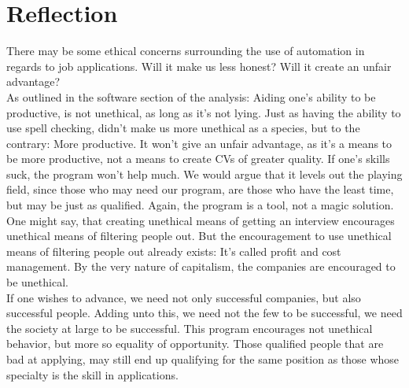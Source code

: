 \section{Reflection}
There may be some ethical concerns surrounding the use of automation in regards to job applications.
Will it make us less honest? Will it create an unfair advantage?\\

As outlined in the software section of the analysis: Aiding one's ability to be productive, is not unethical, as long as it's not lying.
Just as having the ability to use spell checking, didn't make us more unethical as a species, but to the contrary: More productive.
It won't give an unfair advantage, as it's a means to be more productive, not a means to create CVs of greater quality. If one's skills suck, the program won't help much.
We would argue that it levels out the playing field, since those who may need our program, are those who have the least time, but may be just as qualified. Again, the program is a tool, not a magic solution.\\

One might say, that creating unethical means of getting an interview encourages unethical means of filtering people out.
But the encouragement to use unethical means of filtering people out already exists:
It's called profit and cost management. By the very nature of capitalism, the companies are encouraged to be unethical. \\

If one wishes to advance, we need not only successful companies, but also successful people.
Adding unto this, we need not the few to be successful, we need the society at large to be successful. This program encourages not unethical behavior, but more so equality of opportunity.
Those qualified people that are bad at applying, may still end up qualifying for the same position as those whose specialty is the skill in applications.
\newpage